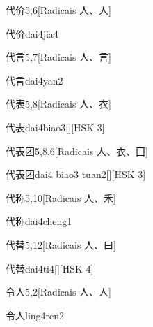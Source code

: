 \begin{entry}{代价}{5,6}[Radicais ⼈、⼈]
  \begin{phonetics}{代价}{dai4jia4}
  \end{phonetics}
\end{entry}

\begin{entry}{代言}{5,7}[Radicais ⼈、⾔]
  \begin{phonetics}{代言}{dai4yan2}
  \end{phonetics}
\end{entry}

\begin{entry}{代表}{5,8}[Radicais ⼈、⾐]
  \begin{phonetics}{代表}{dai4biao3}[][HSK 3]
  \end{phonetics}
\end{entry}

\begin{entry}{代表团}{5,8,6}[Radicais ⼈、⾐、⼞]
  \begin{phonetics}{代表团}{dai4 biao3 tuan2}[][HSK 3]
  \end{phonetics}
\end{entry}

\begin{entry}{代称}{5,10}[Radicais ⼈、⽲]
  \begin{phonetics}{代称}{dai4cheng1}
  \end{phonetics}
\end{entry}

\begin{entry}{代替}{5,12}[Radicais ⼈、⽈]
  \begin{phonetics}{代替}{dai4ti4}[][HSK 4]
  \end{phonetics}
\end{entry}

\begin{entry}{令人}{5,2}[Radicais ⼈、⼈]
  \begin{phonetics}{令人}{ling4ren2}
  \end{phonetics}
\end{entry}

